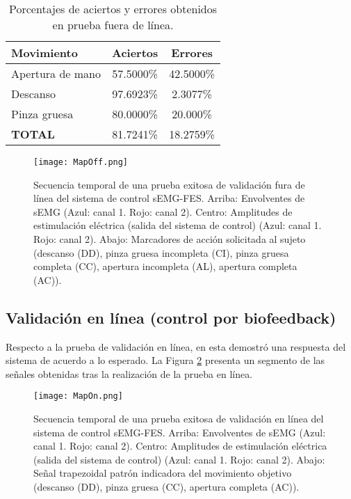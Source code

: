 \begin{table}[htbp]
	\centering
	\begin{tabular}{|l|c|c|}
	\hline
	\textbf{Movimiento} & \textbf{Aciertos} & \textbf{Errores}\\ \hline \hline
	Apertura de mano & 57.5000\% & 42.5000\%\\ \hline
	Descanso & 97.6923\% & 2.3077\%\\ \hline
	Pinza gruesa & 80.0000\% & 20.000\%\\ \hline	
	\textbf{TOTAL} & 81.7241\% & 18.2759\%\\ \hline
	\end{tabular}
	\caption{Porcentajes de aciertos y errores obtenidos en prueba fuera de línea.}
	\label{Cuadro:PorcentajesValores}
\end{table}

\begin{figure}[htbp]
	\centering
	\texttt{[image: MapOff.png]}
	\caption[Secuencia temporal de una prueba exitosa de validación fuera de línea]{Secuencia temporal de una prueba exitosa de validación fura de línea del sistema de control sEMG-FES. Arriba: Envolventes de sEMG (Azul: canal 1. Rojo: canal 2). Centro: Amplitudes de estimulación eléctrica (salida del sistema de control) (Azul: canal 1. Rojo: canal 2). Abajo: Marcadores de acción solicitada al sujeto (descanso (DD), pinza gruesa incompleta (CI), pinza gruesa completa (CC), apertura incompleta (AL), apertura completa (AC)).}
	\label{Figura: MapOff}
\end{figure}


\newpage
\subsection{Validación en línea (control por biofeedback)}
Respecto a la prueba de validación en línea, en esta demostró una respuesta del sistema de acuerdo a lo esperado. La Figura \ref{Figura: MapOn} presenta un segmento de las señales obtenidas tras la realización de la prueba en línea.

\begin{figure}[htbp]
	\centering
	\texttt{[image: MapOn.png]}
	\caption[Secuencia temporal de una prueba exitosa de validación en línea]{Secuencia temporal de una prueba exitosa de validación en línea del sistema de control sEMG-FES.  Arriba: Envolventes de sEMG (Azul: canal 1. Rojo: canal 2). Centro: Amplitudes de estimulación eléctrica (salida del sistema de control) (Azul: canal 1. Rojo: canal 2). Abajo: Señal trapezoidal patrón indicadora del movimiento objetivo (descanso (DD), pinza gruesa (CC), apertura completa (AC)).}
	\label{Figura: MapOn}
\end{figure}



